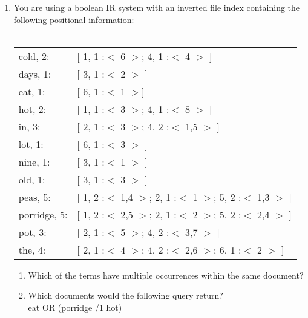 \documentclass[12pt]{article}
\newcommand{\answer}[1]{\fbox{\parbox{\linewidth}{#1}}}
\begin{document}
	
	\begin{enumerate}[itemsep=3em]
		\item{
			You are using a boolean IR system with an inverted file index containing the following positional information:\\ \\			
				\begin{tabular}{l  l}
					cold, 2: &  [ 1, 1 :$<$ 6 $>$; 4, 1 :$<$ 4 $>$ ] \\
					days, 1: &  [ 3, 1 :$<$ 2 $>$ ] \\
					eat, 1: &  [ 6, 1 :$<$ 1 $>$] \\
					hot, 2: &  [ 1, 1 :$<$ 3 $>$; 4, 1 :$<$ 8 $>$ ] \\
					in, 3: &  [ 2, 1 :$<$ 3 $>$; 4, 2 :$<$ 1,5 $>$ ] \\
					lot, 1: &  [ 6, 1 :$<$ 3 $>$ ] \\
					nine, 1: &  [ 3, 1 :$<$ 1 $>$ ] \\
					old, 1: &  [ 3, 1 :$<$ 3 $>$ ] \\
					peas, 5: &  [ 1, 2 :$<$ 1,4 $>$; 2, 1 :$<$ 1 $>$; 5, 2 :$<$ 1,3 $>$ ] \\
					porridge, 5: &  [ 1, 2 :$<$ 2,5 $>$; 2, 1 :$<$ 2 $>$; 5, 2 :$<$ 2,4 $>$ ] \\
					pot, 3: &  [ 2, 1 :$<$ 5 $>$; 4, 2 :$<$ 3,7 $>$ ] \\
					the, 4: &  [ 2, 1 :$<$ 4 $>$; 4, 2 :$<$ 2,6 $>$; 6, 1 :$<$ 2 $>$ ] 
				\end{tabular}
			}
			
			\begin{enumerate}[itemsep=3em]
			\item{
				Which of the terms have multiple occurrences within the same document?
			
				\answer{}
			}
			
			\item{
				Which documents would the following query return? \\ eat OR (porridge /1 hot)
				
				\answer{}
			}
		\end{enumerate}	
		

\end{enumerate}
\end{document}
